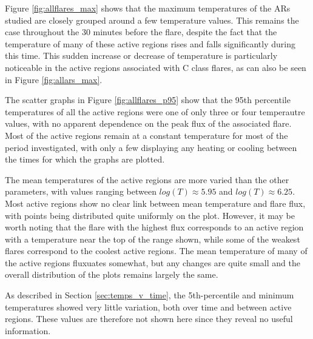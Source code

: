 \documentclass[referee,a4paper,12pt]{swsc}
\begin{document}
\begin{linenumbers}
Figure \ref{fig:allflares_max} shows that the maximum temperatures of the ARs studied are closely grouped around a few temperature values.
This remains the case throughout the 30 minutes before the flare, despite the fact that the temperature of many of these active regions rises and falls significantly during this time.
This sudden increase or decrease of temperature is particularly noticeable in the active regions associated with C class flares, as can also be seen in Figure \ref{fig:allars_max}.

The scatter graphs in Figure \ref{fig:allflares_p95} show that the 95th percentile temperatures of all the active regions were one of only three or four temperautre values, with no apparent dependence on the peak flux of the associated flare. Most of the active regions remain at a constant temperature for most of the period investigated, with only a few displaying any heating or cooling between the times for which the graphs are plotted.

The mean temperatures of the active regions are more varied than the other parameters, with values ranging between $log(T) \approx 5.95$ and $log(T) \approx 6.25$. 
Most active regions show no clear link between mean temperature and flare flux, with points being distributed quite uniformly on the plot.
However, it may be worth noting that the flare with the highest flux corresponds to an active region with a temperature near the top of the range shown, while some of the weakest flares correspond to the coolest active regions.
The mean temperature of many of the active regions fluxuates somewhat, but any changes are quite small and the overall distribution of the plots remains largely the same.

As described in Section \ref{sec:temps_v_time}, the 5th-percentile and minimum temperatures showed very little variation, both over time and between active regions.
These values are therefore not shown here since they reveal no useful information.


\end{linenumbers}
\end{document}
